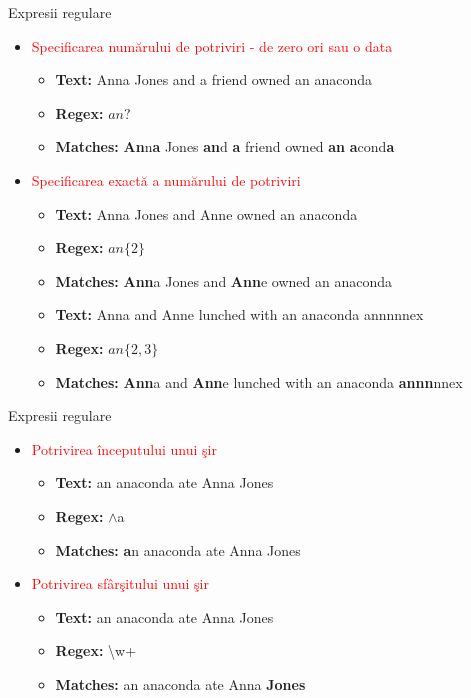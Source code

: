 \documentclass[pdf]{beamer}
\begin{document}
\begin{frame}{Expresii regulare}
\begin{itemize}
\item \textcolor{red}{Specificarea numărului de potriviri - de zero ori sau o data}
\begin{itemize}
\item
\textbf{Text:} Anna Jones and a friend owned an anaconda
\item
\textbf{Regex:} $an?$
\item
\textbf{Matches:} \textbf{An}n\textbf{a} Jones \textbf{an}d \textbf{a} friend owned \textbf{an} \textbf{a}cond\textbf{a}
\end{itemize}

\item \textcolor{red}{Specificarea exactă a numărului de potriviri}
\begin{itemize}
\item
\textbf{Text:} Anna Jones and Anne owned an anaconda
\item
\textbf{Regex:} $an\{2\}$
\item
\textbf{Matches:} \textbf{Ann}a Jones and \textbf{Ann}e owned an anaconda
\newline
\item
\textbf{Text:} Anna and Anne lunched with an anaconda annnnnex
\item
\textbf{Regex:}  $an\{2,3\}$
\item
\textbf{Matches:} \textbf{Ann}a and \textbf{Ann}e lunched with an anaconda \textbf{annn}nnex
\end{itemize}
\end{itemize}
\end{frame}

\begin{frame}{Expresii regulare}
\begin{itemize}
\item\textcolor{red}{ Potrivirea începutului unui şir}
\begin{itemize}
\item \textbf{Text:} an anaconda ate Anna Jones
\item \textbf{Regex:} $\wedge$a
\item \textbf{Matches:} \textbf{a}n anaconda ate Anna Jones
\end{itemize}
\item\textcolor {red}{Potrivirea sfârşitului unui şir}
\begin{itemize}
\item \textbf{Text:} an anaconda ate Anna Jones
\item \textbf{Regex:} \textbackslash w+\textdollar
\item \textbf{Matches:} an anaconda ate Anna \textbf{Jones}
\end{itemize}
\end{itemize}
\end{frame}
\end{document}
